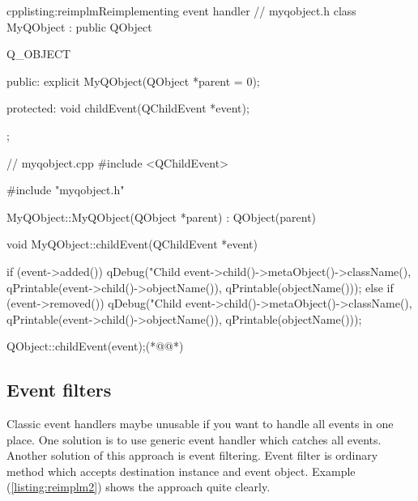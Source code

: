 \begin{fdoccode}{cpp}{listing:reimplm}{Reimplementing event handler}
// myqobject.h
class MyQObject : public QObject{
	Q_OBJECT

    public:
		explicit MyQObject(QObject *parent = 0);

    protected:
		void childEvent(QChildEvent *event);
};

// myqobject.cpp
#include <QChildEvent>

#include "myqobject.h"


MyQObject::MyQObject(QObject *parent) : QObject(parent) {
}

void MyQObject::childEvent(QChildEvent *event) {
    if (event->added()) {
		qDebug("Child %
	       	event->child()->metaObject()->className(),
	       	qPrintable(event->child()->objectName()),
	       	qPrintable(objectName()));
    }
    else if (event->removed()) {
		qDebug("Child %
	       	event->child()->metaObject()->className(),
	       	qPrintable(event->child()->objectName()),
	       	qPrintable(objectName()));
    }

    QObject::childEvent(event);(*@\label{listing:handl}@*)
}
\end{fdoccode}


\subsection{Event filters}
Classic event handlers maybe unusable if you want to handle all events in one place. One solution is to use generic event handler which catches all events. Another solution of this approach is event filtering. Event filter is ordinary method which accepts destination instance and event object. Example (\autoref{listing:reimplm2}) shows the approach quite clearly.

